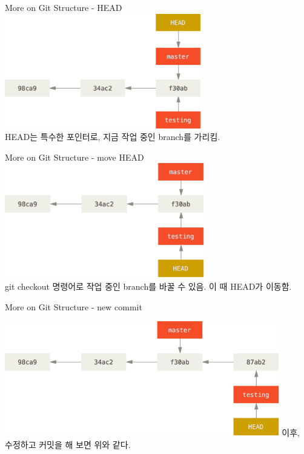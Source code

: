 \documentclass{beamer}
\begin{document}
\begin{frame}{More on Git Structure - HEAD} 
\includegraphics[height=5cm,keepaspectratio]{head-to-master} \\
HEAD는 특수한 포인터로, 지금 작업 중인 branch를 가리킴. 
\end{frame}


\begin{frame}{More on Git Structure - move HEAD} 
\includegraphics[height=5cm,keepaspectratio]{head-to-testing} \\
git checkout 명령어로 작업 중인 branch를 바꿀 수 있음. 이 때 HEAD가 이동함. 
\end{frame}


\begin{frame}{More on Git Structure - new commit} 

\includegraphics[height=5cm,keepaspectratio]{advance-testing}
이후, 수정하고 커밋을 해 보면 위와 같다.
\end{frame}
\end{document}
